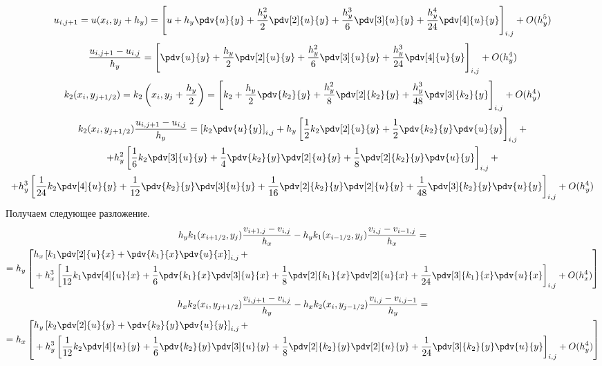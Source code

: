 \[
    u_{i,j+1} = u(x_{i}, y_{j} + h_y) = \left[ u + h_y \pdv{u}{y} + \frac{h_y^2}{2} \pdv[2]{u}{y} +
    \frac{h_y^3}{6} \pdv[3]{u}{y} + \frac{h_y^4}{24} \pdv[4]{u}{y} \right]_{i,j} + O(h_y^5)
\]
\[
    \frac{u_{i,j+1} - u_{i,j}}{h_y} = \left[ \pdv{u}{y} + \frac{h_y}{2} \pdv[2]{u}{y} +
    \frac{h_y^2}{6} \pdv[3]{u}{y} + \frac{h_y^3}{24} \pdv[4]{u}{y} \right]_{i,j} + O(h_y^4)
\]
\[
    k_2(x_{i},y_{j+1/2}) = k_2 \left( x_{i},y_{j} + \frac{h_y}{2} \right) = \left[
        k_2 + \frac{h_y}{2} \pdv{k_2}{y} + \frac{h_y^2}{8} \pdv[2]{k_2}{y} + \frac{h_y^3}{48} \pdv[3]{k_2}{y}
    \right]_{i,j} + O(h_y^4)
\]
\begin{multline*}
    k_2(x_{i},y_{j+1/2}) \frac{u_{i,j+1} - u_{i,j}}{h_y} = \left[ k_2 \pdv{u}{y} \right]_{i,j} +
    h_y \left[ \frac{1}{2} k_2 \pdv[2]{u}{y} + \frac{1}{2} \pdv{k_2}{y} \pdv{u}{y} \right]_{i,j} + \\
    + h_y^2 \left[ \frac{1}{6} k_2 \pdv[3]{u}{y} + \frac{1}{4} \pdv{k_2}{y} \pdv[2]{u}{y} + \frac{1}{8} \pdv[2]{k_2}{y} \pdv{u}{y} \right]_{i,j} + \\
    + h_y^3 \left[ \frac{1}{24} k_2 \pdv[4]{u}{y} + \frac{1}{12} \pdv{k_2}{y} \pdv[3]{u}{y} + \frac{1}{16} \pdv[2]{k_2}{y} \pdv[2]{u}{y} + \frac{1}{48} \pdv[3]{k_2}{y} \pdv{u}{y} \right]_{i,j} + O(h_y^4)
\end{multline*}
Получаем следующее разложение.
\begin{multline*}
    h_y k_1(x_{i+1/2},y_{j}) \frac{v_{i+1,j} - v_{i,j}}{h_x} - h_y k_1(x_{i-1/2},y_{j}) \frac{v_{i,j} - v_{i-1,j}}{h_x} = \\
    = h_y \left[ \begin{aligned}
        & h_x \left[ k_1 \pdv[2]{u}{x} + \pdv{k_1}{x} \pdv{u}{x} \right]_{i,j} + \\
        & + h_x^3 \left[ \frac{1}{12} k_1 \pdv[4]{u}{x} + \frac{1}{6} \pdv{k_1}{x} \pdv[3]{u}{x} + \frac{1}{8} \pdv[2]{k_1}{x} \pdv[2]{u}{x} + \frac{1}{24} \pdv[3]{k_1}{x} \pdv{u}{x} \right]_{i,j} + O(h_x^4)
    \end{aligned} \right]
\end{multline*}
\begin{multline*}
    h_x k_2(x_{i},y_{j+1/2}) \frac{v_{i,j+1} - v_{i,j}}{h_y} - h_x k_2(x_{i},y_{j-1/2}) \frac{v_{i,j} - v_{i,j-1}}{h_y} = \\
    = h_x \left[ \begin{aligned}
        & h_y \left[ k_2 \pdv[2]{u}{y} + \pdv{k_2}{y} \pdv{u}{y} \right]_{i,j} + \\
        & + h_y^3 \left[ \frac{1}{12} k_2 \pdv[4]{u}{y} + \frac{1}{6} \pdv{k_2}{y} \pdv[3]{u}{y} + \frac{1}{8} \pdv[2]{k_2}{y} \pdv[2]{u}{y} + \frac{1}{24} \pdv[3]{k_2}{y} \pdv{u}{y} \right]_{i,j} + O(h_y^4)
    \end{aligned} \right]
\end{multline*}

